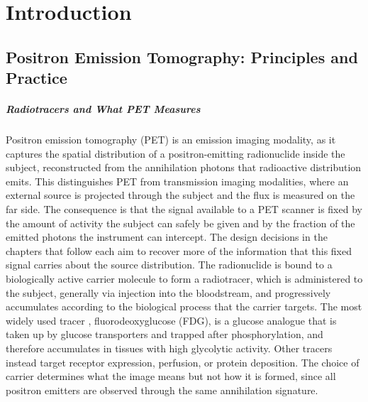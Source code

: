 \chapter{Introduction}
\label{ch:introduction}

\section{Positron Emission Tomography: Principles and Practice}
\label{sec:pet-principles}

\paragraph{Radiotracers and What PET Measures}
Positron emission tomography (PET) is an emission imaging modality, as it captures the spatial distribution of a positron-emitting radionuclide inside the subject, reconstructed from the annihilation photons that radioactive distribution emits.
This distinguishes PET from transmission imaging modalities, where an external source is projected through the subject and the flux is measured on the far side.
The consequence is that the signal available to a PET scanner is fixed by the amount of activity the subject can safely be given and by the fraction of the emitted photons the instrument can intercept. The design decisions in the chapters that follow each aim to recover more of the information that this fixed signal carries about the source distribution.
The radionuclide is bound to a biologically active carrier molecule to form a radiotracer, which is administered to the subject, generally via injection into the bloodstream, and progressively accumulates according to the biological process that the carrier targets.
The most widely used tracer , fluorodeoxyglucose (FDG), is a glucose analogue that is taken up by glucose transporters and trapped after phosphorylation, and therefore accumulates in tissues with high glycolytic activity. Other tracers instead target receptor expression, perfusion, or protein deposition.
The choice of carrier determines what the image means but not how it is formed, since all positron emitters are observed through the same  annihilation signature.

